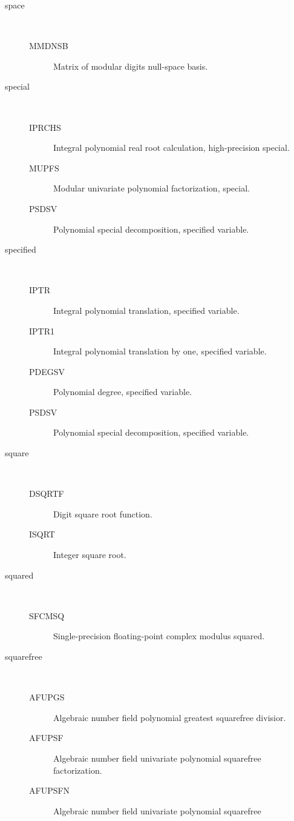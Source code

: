 \begin{description}
\begin{description}
  \end{description}
\item[space] \ \ 
  \begin{description}
  \item[MMDNSB]  Matrix of modular digits null-space basis.
  \end{description}
\item[special] \ \ 
  \begin{description}
  \item[IPRCHS]  Integral polynomial real root calculation, high-precision
    special.
  \item[MUPFS]  Modular univariate polynomial factorization, special.
  \item[PSDSV]  Polynomial special decomposition, specified variable.
  \end{description}
\item[specified] \ \ 
  \begin{description}
  \item[IPTR]  Integral polynomial translation, specified variable.
  \item[IPTR1]  Integral polynomial translation by one, specified variable.
  \item[PDEGSV]  Polynomial degree, specified variable.
  \item[PSDSV]  Polynomial special decomposition, specified variable.
  \end{description}
\item[square] \ \ 
  \begin{description}
  \item[DSQRTF]  Digit square root function.
  \item[ISQRT]  Integer square root.
  \end{description}
\item[squared] \ \ 
  \begin{description}
  \item[SFCMSQ]  Single-precision floating-point complex modulus squared.
  \end{description}
\item[squarefree] \ \ 
  \begin{description}
  \item[AFUPGS]  Algebraic number field polynomial greatest squarefree
    divisior.
  \item[AFUPSF]  Algebraic number field univariate polynomial squarefree
    factorization.
  \item[AFUPSFN]  Algebraic number field univariate polynomial squarefree

\end{description}
\end{description}
